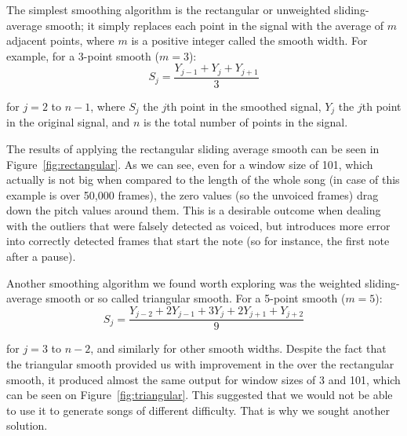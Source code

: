 The simplest smoothing algorithm is the rectangular or unweighted sliding-average smooth; it simply replaces each point in the signal with the average of $m$ adjacent points, where $m$ is a positive integer called the smooth width. For example, for a 3-point smooth ($m = 3$):
\begin{equation}
	S_{j} = \frac{Y_{j-1} + Y_{j} + Y_{j+1}}{3}
\end{equation}

for $j = 2$ to $n-1$, where $S_{j}$ the $j$th point in the smoothed signal, $Y_{j}$ the $j$th point in the original signal, and $n$ is the total number of points in the signal. 

The results of applying the rectangular sliding average smooth can be seen in Figure~\ref{fig:rectangular}. As we can see, even for a window size of 101, which actually is not big when compared to the length of the whole song (in case of this example is over 50,000 frames), the zero values (so the unvoiced frames) drag down the pitch values around them. This is a desirable outcome when dealing with the outliers that were falsely detected as voiced, but introduces more error into correctly detected frames that start the note (so for instance, the first note after a pause).

Another smoothing algorithm we found worth exploring was the weighted sliding-average smooth or so called triangular smooth. 
For a 5-point smooth ($m = 5$):
\begin{equation}
S_{j} = \frac{Y_{j-2} + 2Y_{j-1} + 3Y_{j} + 2Y_{j+1} + Y_{j+2}}{9}
\end{equation}
 
for $j = 3$ to $n-2$, and similarly for other smooth widths. Despite the fact that the triangular smooth provided us with improvement in the over the rectangular smooth, it produced almost the same output for window sizes of 3 and 101, which can be seen on Figure~\ref{fig:triangular}. This suggested that we would not be able to use it to generate songs of different difficulty. That is why we sought another solution.




